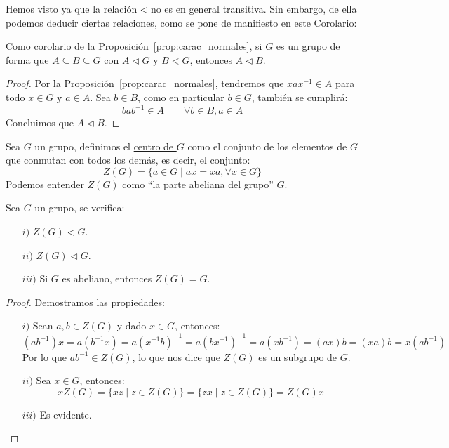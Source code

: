 \noindent
Hemos visto ya que la relación $\lhd$ no es en general transitiva. Sin embargo, de ella podemos deducir ciertas relaciones, como se pone de manifiesto en este Corolario:
\begin{coro}\label{coro:trans_normales}
    Como corolario de la Proposición~\ref{prop:carac_normales}, si $G$ es un grupo de forma que $A\subseteq B\subseteq G$ con $A\lhd G$ y $B < G$, entonces $A \lhd B$.
    \begin{proof}
        Por la Proposición~\ref{prop:carac_normales}, tendremos que $xax^{-1}\in A$ para todo $x\in G$ y $a\in A$. Sea $b\in B$, como en particular $b\in G$, también se cumplirá:
        \begin{equation*}
            bab^{-1}\in A \qquad \forall b\in B, a\in A
        \end{equation*}
        Concluimos que $A\lhd B$.
    \end{proof}
\end{coro}

\begin{definicion}[Centro]
    Sea $G$ un grupo, definimos el \underline{centro de $G$} como el conjunto de los elementos de $G$ que conmutan con todos los demás, es decir, el conjunto:
    \begin{equation*}
        Z(G) = \{a\in G \mid ax = xa, \forall x\in G\}
    \end{equation*}
Podemos entender $Z(G)$ como ``la parte abeliana del grupo'' $G$.
\end{definicion}

\begin{prop}
    Sea $G$ un grupo, se verifica:
    \begin{enumerate}
        \item[$i)$] $Z(G)<G$.
        \item[$ii)$] $Z(G)\lhd G$.
        \item[$iii)$] Si $G$ es abeliano, entonces $Z(G) = G$.
    \end{enumerate}
    \begin{proof}
        Demostramos las propiedades:
        \begin{enumerate}
            \item[$i)$] Sean $a,b\in Z(G)$ y dado $x\in G$, entonces:
                \begin{equation*}
                    (ab^{-1})x = a(b^{-1}x) = a{(x^{-1}b)}^{-1} = a{(bx^{-1})}^{-1} = a(xb^{-1}) = (ax)b = (xa)b = x(ab^{-1})
                \end{equation*}
                Por lo que $ab^{-1}\in Z(G)$, lo que nos dice que $Z(G)$ es un subgrupo de $G$.
            \item[$ii)$] Sea $x\in G$, entonces:
                \begin{equation*}
                    xZ(G) = \{xz \mid z\in Z(G)\} = \{zx \mid z\in Z(G)\} = Z(G)x
                \end{equation*}
            \item[$iii)$] Es evidente.
        \end{enumerate}
    \end{proof}
\end{prop}


